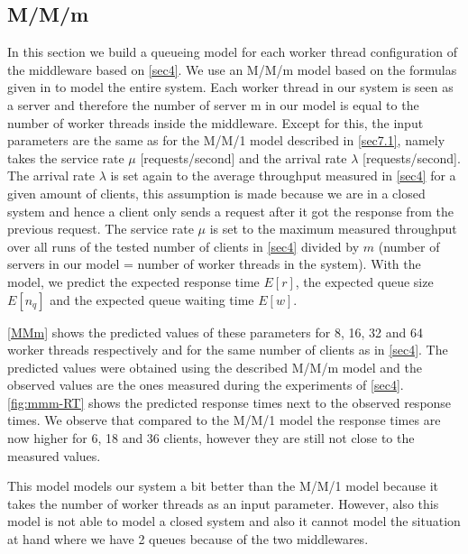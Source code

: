\documentclass[11pt,a4paper]{article}
\begin{document}
\subsection{M/M/m} \label{sec7.2}
In this section we build a queueing model for each worker thread configuration of the middleware based on \autoref{sec4}. We use an M/M/m model based on the formulas given in \cite{book1} to model the entire system. Each worker thread in our system is seen as a server and therefore the number of server m in our model is equal to the  number of worker threads inside the middleware. Except for this, the input parameters are the same as for the M/M/1 model described in \autoref{sec7.1}, namely takes the service rate $\mu$ [requests/second] and the arrival rate $\lambda$ [requests/second]. The arrival rate $\lambda$ is set again to the average throughput measured in \autoref{sec4} for a given amount of clients, this assumption is made because we are in a closed system and hence a client only sends a request after it got the response from the previous request. The service rate $\mu$ is set to the maximum measured throughput over all runs of the tested number of clients in \autoref{sec4} divided by $m$ (number of servers in our model = number of worker threads in the system). 
With the model, we predict the expected response time $E[r]$, the expected queue size $E[n_q]$ and the expected queue waiting time $E[w]$.

\autoref{MMm} shows the predicted values of these parameters for 8, 16, 32 and 64 worker threads respectively and for the same number of clients as in \autoref{sec4}. The predicted values were obtained using the described M/M/m model and the observed values are the ones measured during the experiments of \autoref{sec4}.
\autoref{fig:mmm-RT} shows the predicted response times next to the observed response times. We observe that compared to the M/M/1 model the response times are now higher for 6, 18 and 36 clients, however they are still not close to the measured values. 

This model models our system a bit better than the M/M/1 model because it takes the number of worker threads as an input parameter. However, also this model is not able to model a closed system and also it cannot model the situation at hand where we have 2 queues because of the two middlewares.
\end{document}
